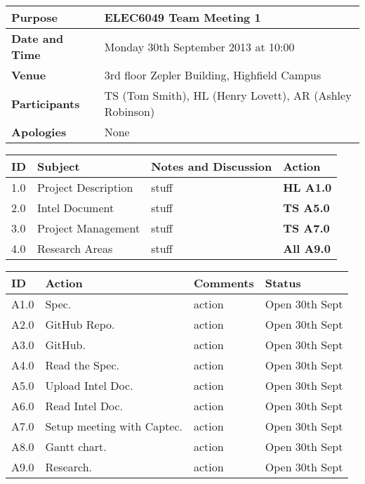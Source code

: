 \documentclass{elec6049Report}     %
\begin{document}
\clearpage

\begin{center}
\begin{longtable}{| m{} | m{} |} \hline
\textbf{Purpose} & ELEC6049 Team Meeting 1 \\ \hline
\textbf{Date and Time} & Monday 30th September 2013 at 10:00 \\ \hline
\textbf{Venue} & 3rd floor Zepler Building, Highfield Campus \\ \hline
\textbf{Participants} & TS (Tom Smith), HL (Henry Lovett), AR (Ashley Robinson)\\ \hline
\textbf{Apologies} &None \\ \hline
\end{longtable}
\end{center}

\begin{center}
\begin{longtable}{| p{} |>{\raggedright\arraybackslash}p{} | p{} |>{\raggedright\arraybackslash}p{}|} \hline
\textbf{ID} & \textbf{Subject} & \textbf{Notes and Discussion} & \textbf{Action} \\ \hline
\endhead
1.0	&	Project Description	&	stuff	&	\textbf{HL A1.0} \\ \hline
2.0	&	Intel Document	&	stuff	&	\textbf{TS A5.0} \\ \hline
3.0	&	Project Management	&	stuff &	\textbf{TS A7.0} \\ \hline
4.0	&	Research Areas	&	stuff &	\textbf{All A9.0} \\ \hline


\end{longtable}
\end{center}

\begin{center}
\begin{longtable}{| p{} | >{\raggedright\arraybackslash}p{} |  p{} | >{\raggedright\arraybackslash}p{}|} \hline
\textbf{ID} & \textbf{Action} & \textbf{Comments} & \textbf{Status} \\ \hline
\endhead
A1.0	&	 Spec.	&	action 	& Open 30th Sept \\ \hline
A2.0	&	GitHub Repo.	&	action	&	Open 30th Sept \\ \hline
A3.0	&	GitHub.		&	action	&	Open 30th Sept	\\ \hline
A4.0	&	Read the Spec.	&	action	&	Open 30th Sept \\ \hline
A5.0	&	Upload Intel Doc.	&	action	&	Open 30th Sept \\ \hline
A6.0	&	Read Intel Doc.	&	action	&	Open 30th Sept \\ \hline
A7.0	&	Setup meeting with Captec.	&	action	&	Open 30th Sept \\ \hline
A8.0	&	Gantt chart.	&	action	&	Open 30th Sept	\\ \hline
A9.0	&	Research.&	action  &	Open 30th Sept	\\ \hline	
\end{longtable}
\end{center}
\end{document}
